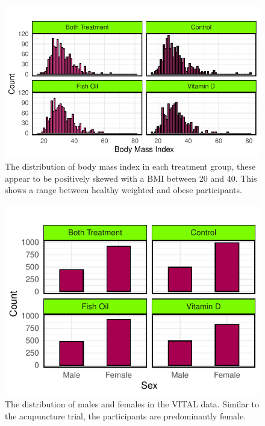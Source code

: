 \documentclass{article}
\begin{document}
\begin{figure}

{\centering \includegraphics{Final_Report_files/figure-latex/unnamed-chunk-15-1} 

}

\caption{The distribution of body mass index in each treatment group, these appear to be positively skewed with a BMI between 20 and 40. This shows a range between healthy weighted and obese participants.}\label{fig:unnamed-chunk-15}
\end{figure}

\begin{figure}

{\centering \includegraphics{Final_Report_files/figure-latex/unnamed-chunk-16-1} 

}

\caption{The distribution of males and females in the VITAL data. Similar to the acupuncture trial, the participants are predominantly female.}\label{fig:unnamed-chunk-16}
\end{figure}
\end{document}
